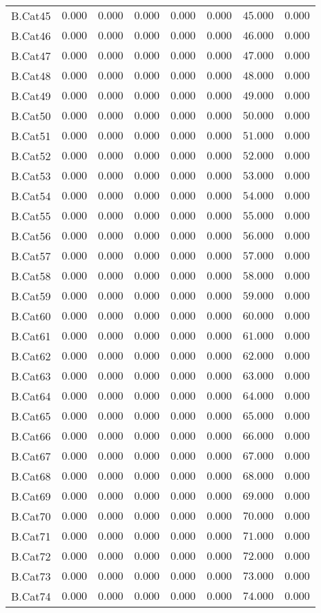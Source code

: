 \documentclass[6pt]{article}
\begin{document}
{\begin{longtable}{lrrrrrrr}
B.Cat45&$ 0.000$&$ 0.000$&$ 0.000$&$ 0.000$&$ 0.000$&$ 45.000$&$ 0.000$\tabularnewline
B.Cat46&$ 0.000$&$ 0.000$&$ 0.000$&$ 0.000$&$ 0.000$&$ 46.000$&$ 0.000$\tabularnewline
B.Cat47&$ 0.000$&$ 0.000$&$ 0.000$&$ 0.000$&$ 0.000$&$ 47.000$&$ 0.000$\tabularnewline
B.Cat48&$ 0.000$&$ 0.000$&$ 0.000$&$ 0.000$&$ 0.000$&$ 48.000$&$ 0.000$\tabularnewline
B.Cat49&$ 0.000$&$ 0.000$&$ 0.000$&$ 0.000$&$ 0.000$&$ 49.000$&$ 0.000$\tabularnewline
B.Cat50&$ 0.000$&$ 0.000$&$ 0.000$&$ 0.000$&$ 0.000$&$ 50.000$&$ 0.000$\tabularnewline
B.Cat51&$ 0.000$&$ 0.000$&$ 0.000$&$ 0.000$&$ 0.000$&$ 51.000$&$ 0.000$\tabularnewline
B.Cat52&$ 0.000$&$ 0.000$&$ 0.000$&$ 0.000$&$ 0.000$&$ 52.000$&$ 0.000$\tabularnewline
B.Cat53&$ 0.000$&$ 0.000$&$ 0.000$&$ 0.000$&$ 0.000$&$ 53.000$&$ 0.000$\tabularnewline
B.Cat54&$ 0.000$&$ 0.000$&$ 0.000$&$ 0.000$&$ 0.000$&$ 54.000$&$ 0.000$\tabularnewline
B.Cat55&$ 0.000$&$ 0.000$&$ 0.000$&$ 0.000$&$ 0.000$&$ 55.000$&$ 0.000$\tabularnewline
B.Cat56&$ 0.000$&$ 0.000$&$ 0.000$&$ 0.000$&$ 0.000$&$ 56.000$&$ 0.000$\tabularnewline
B.Cat57&$ 0.000$&$ 0.000$&$ 0.000$&$ 0.000$&$ 0.000$&$ 57.000$&$ 0.000$\tabularnewline
B.Cat58&$ 0.000$&$ 0.000$&$ 0.000$&$ 0.000$&$ 0.000$&$ 58.000$&$ 0.000$\tabularnewline
B.Cat59&$ 0.000$&$ 0.000$&$ 0.000$&$ 0.000$&$ 0.000$&$ 59.000$&$ 0.000$\tabularnewline
B.Cat60&$ 0.000$&$ 0.000$&$ 0.000$&$ 0.000$&$ 0.000$&$ 60.000$&$ 0.000$\tabularnewline
B.Cat61&$ 0.000$&$ 0.000$&$ 0.000$&$ 0.000$&$ 0.000$&$ 61.000$&$ 0.000$\tabularnewline
B.Cat62&$ 0.000$&$ 0.000$&$ 0.000$&$ 0.000$&$ 0.000$&$ 62.000$&$ 0.000$\tabularnewline
B.Cat63&$ 0.000$&$ 0.000$&$ 0.000$&$ 0.000$&$ 0.000$&$ 63.000$&$ 0.000$\tabularnewline
B.Cat64&$ 0.000$&$ 0.000$&$ 0.000$&$ 0.000$&$ 0.000$&$ 64.000$&$ 0.000$\tabularnewline
B.Cat65&$ 0.000$&$ 0.000$&$ 0.000$&$ 0.000$&$ 0.000$&$ 65.000$&$ 0.000$\tabularnewline
B.Cat66&$ 0.000$&$ 0.000$&$ 0.000$&$ 0.000$&$ 0.000$&$ 66.000$&$ 0.000$\tabularnewline
B.Cat67&$ 0.000$&$ 0.000$&$ 0.000$&$ 0.000$&$ 0.000$&$ 67.000$&$ 0.000$\tabularnewline
B.Cat68&$ 0.000$&$ 0.000$&$ 0.000$&$ 0.000$&$ 0.000$&$ 68.000$&$ 0.000$\tabularnewline
B.Cat69&$ 0.000$&$ 0.000$&$ 0.000$&$ 0.000$&$ 0.000$&$ 69.000$&$ 0.000$\tabularnewline
B.Cat70&$ 0.000$&$ 0.000$&$ 0.000$&$ 0.000$&$ 0.000$&$ 70.000$&$ 0.000$\tabularnewline
B.Cat71&$ 0.000$&$ 0.000$&$ 0.000$&$ 0.000$&$ 0.000$&$ 71.000$&$ 0.000$\tabularnewline
B.Cat72&$ 0.000$&$ 0.000$&$ 0.000$&$ 0.000$&$ 0.000$&$ 72.000$&$ 0.000$\tabularnewline
B.Cat73&$ 0.000$&$ 0.000$&$ 0.000$&$ 0.000$&$ 0.000$&$ 73.000$&$ 0.000$\tabularnewline
B.Cat74&$ 0.000$&$ 0.000$&$ 0.000$&$ 0.000$&$ 0.000$&$ 74.000$&$ 0.000$\tabularnewline

\end{longtable}}
\end{document}
